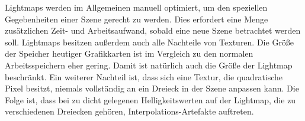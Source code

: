 			Lightmaps werden im Allgemeinen manuell optimiert, um den speziellen Gegebenheiten einer Szene gerecht zu werden.
			Dies erfordert eine Menge zusätzlichen Zeit- und Arbeitsaufwand, sobald eine neue Szene betrachtet werden soll.
			Lightmaps besitzen außerdem auch alle Nachteile von Texturen.
			Die Größe der Speicher heutiger Grafikkarten ist im Vergleich zu den normalen Arbeitsspeichern eher gering.
			Damit ist natürlich auch die Größe der Lightmap beschränkt.
			Ein weiterer Nachteil ist, dass sich eine Textur, die quadratische Pixel besitzt, niemals vollständig an ein Dreieck in der Szene anpassen kann.
			Die Folge ist, dass bei zu dicht gelegenen Helligkeitswerten auf der Lightmap, die zu verschiedenen Dreiecken gehören, Interpolations-Artefakte auftreten.



